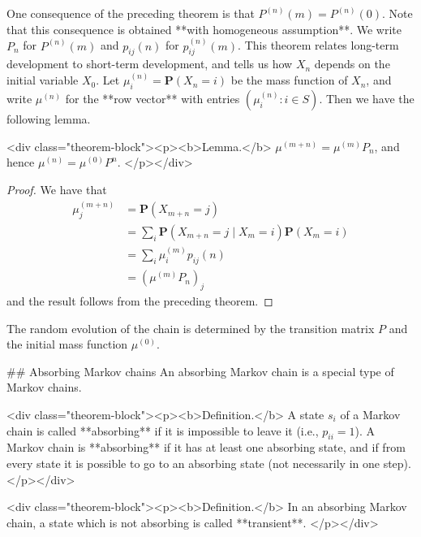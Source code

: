 One consequence of the preceding theorem is that $P^{(n)}(m) = P^{(n)}(0)$. Note that this consequence is obtained **with homogeneous assumption**. We write $P_n$ for $P^{(n)}(m)$ and $p_{ij}(n)$ for $p_{ij}^{(n)}(m)$. This theorem relates long-term development to short-term development, and tells us how $X_n$ depends on the initial variable $X_0$. Let $\mu_i^{(n)} = \mathbf{P}(X_n = i)$ be the mass function of $X_n$, and write $\mu^{(n)}$ for the **row vector** with entries $(\mu_i^{(n)} : i \in S)$. Then we have the following lemma.

<div class="theorem-block"><p><b>Lemma.</b> 
$\mu^{(m+n)} = \mu^{(m)}P_n$, and hence $\mu^{(n)} = \mu^{(0)}P^n$.
</p></div>

\begin{proof}
    We have that
    $$\begin{equation}
        \begin{split}
            \mu_j^{(m+n)} &= \mathbf{P}(X_{m+n} = j) \\
            &= \sum_{i} \mathbf{P}(X_{m+n} = j \;\vert\; X_m = i) \mathbf{P}(X_m = i) \\
            &= \sum_{i} \mu_i^{(m)} p_{ij}(n) \\
            &= (\mu^{(m)} P_n)_j
        \end{split}
    \end{equation}$$
    and the result follows from the preceding theorem.
\end{proof}

The random evolution of the chain is determined by the transition matrix $P$ and the initial mass function $\mu^{(0)}$.


## Absorbing Markov chains
An absorbing Markov chain is a special type of Markov chains.

<div class="theorem-block"><p><b>Definition.</b> 
A state $s_i$ of a Markov chain is called **absorbing** if it is impossible to leave it (i.e., $p_{ii} = 1$). A Markov chain is **absorbing** if it has at least one absorbing state, and if from every state it is possible to go to an absorbing state (not necessarily in one step).
</p></div>

<div class="theorem-block"><p><b>Definition.</b> 
In an absorbing Markov chain, a state which is not absorbing is called **transient**.
</p></div>

